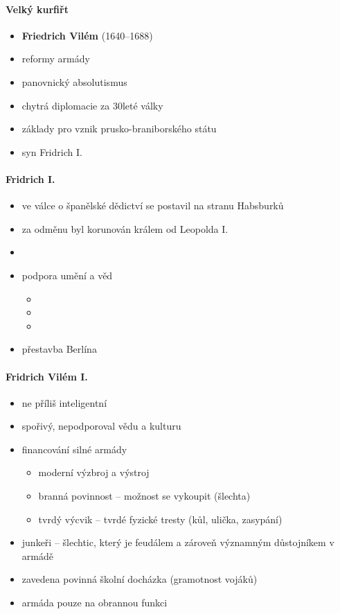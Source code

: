 \paragraph{Velký kurfiřt}
\begin{itemize}
\item \textbf{Friedrich Vilém} (1640--1688)
\item reformy armády
\item panovnický absolutismus
\item chytrá diplomacie za 30leté války
\item základy pro vznik prusko-braniborského státu
\item syn Fridrich I.
\end{itemize}

\paragraph{Fridrich I.}
\begin{itemize}
\item ve válce o španělské dědictví se postavil na stranu Habsburků
\item za odměnu byl korunován králem od Leopolda I.
\item {}
\item podpora umění a věd
	\begin{itemize}
	\item {}
	\item {}
	\item {}
	\end{itemize}
\item přestavba Berlína
\end{itemize}

\paragraph{Fridrich Vilém I.}
\begin{itemize}
\item ne příliš inteligentní
\item spořivý, nepodporoval vědu a kulturu
\item financování silné armády
	\begin{itemize}
	\item moderní výzbroj a výstroj
	\item branná povinnost -- možnost se vykoupit (šlechta)
	\item tvrdý výcvik -- tvrdé fyzické tresty (kůl, ulička, zasypání)
	\end{itemize}
\item junkeři -- šlechtic, který je feudálem a zároveň významným důstojníkem v armádě
\item zavedena povinná školní docházka (gramotnost vojáků)
\item armáda pouze na obrannou funkci
\end{itemize}

